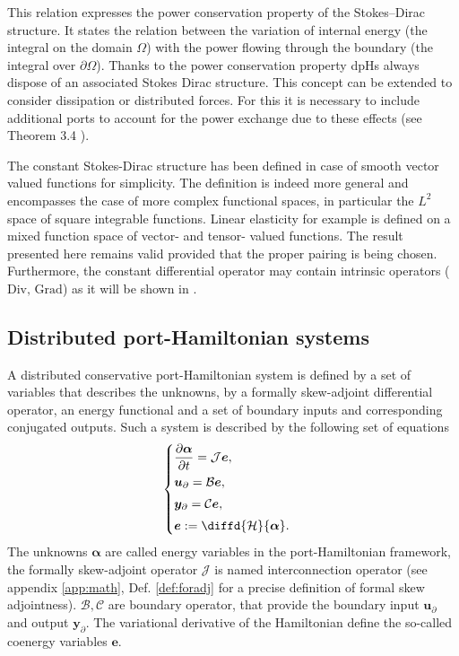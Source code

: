 This  relation expresses the  power  conservation property of the Stokes–Dirac structure. It states the relation between the variation of internal energy (the integral on the domain $\Omega$) with the power flowing through the boundary (the integral over $\partial\Omega$). Thanks to the power conservation property dpHs always dispose of an associated Stokes Dirac structure. This concept can be extended to consider dissipation or distributed forces. For this it is necessary to include additional ports to account for the power exchange due to these effects (see Theorem 3.4 \cite{macchelli2005modelling}). 


\begin{remark}
	The constant Stokes-Dirac structure has been defined in case of smooth vector valued functions for simplicity.  The definition is indeed more general and encompasses the case of more complex functional spaces, in particular the $L^2$ space of square integrable functions.  Linear elasticity for example is defined on a mixed function space of vector- and tensor- valued functions. The result presented here remains valid provided that the proper {pairing is being chosen}. Furthermore, the constant differential operator may contain intrinsic operators ($\mathrm{Div}, \, \mathrm{Grad}$) as it will be shown in .
\end{remark}


\subsection{Distributed port-Hamiltonian systems}

A distributed conservative port-Hamiltonian system is defined by a set of variables that describes the unknowns, by a formally skew-adjoint differential operator, an energy functional and a set of boundary inputs and corresponding conjugated outputs. Such a system is described by the following set of equations
\begin{equation}\label{eq:syspH}
\begin{cases}
\displaystyle \diffp{\bm{\alpha}}{t} = \mathcal{J}\displaystyle \bm{e}, \vspace{3pt}\\
\bm{u}_\partial = \mathcal{B}  \displaystyle \bm{e}, \vspace{3pt}\\
\bm{y}_\partial = \mathcal{C} \displaystyle \bm{e}, \vspace{3pt}\\
\bm{e} := \displaystyle \diffd{\mathcal{H}}{\bm{\alpha}}.
\end{cases}
\end{equation}
The unknowns $\bm{\alpha}$ are called energy variables in the port-Hamiltonian framework, the formally skew-adjoint operator $\mathcal{J}$ is named interconnection operator (see appendix \ref{app:math}, Def. \ref{def:foradj} for a precise definition of formal skew adjointness). $\mathcal{B}, \mathcal{C}$ are boundary operator, that provide the boundary input $\bm{u}_\partial$ and output $\bm{y}_\partial$. The variational derivative of the Hamiltonian define the so-called coenergy variables $\bm{e}$.

